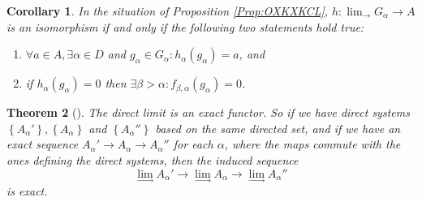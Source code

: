 \documentclass[reqno]{amsart}
\newtheorem{theorem}{Theorem}[section]
\newtheorem{corollary}[theorem]{Corollary}
\theoremstyle{definition}
\theoremstyle{remark}
\begin{document}
\begin{corollary}
    In the situation of Proposition
    \ref{Prop:OXKXKCL},
    $h \colon \lim_{\rightarrow} G_{\alpha} \to A$ is an
    isomorphism if and only if the following two statements
    hold true:
    \begin{enumerate}
        \item $\forall a \in A, \exists \alpha \in D$ and
            $g_{\alpha} \in G_{\alpha} \colon
            h_{\alpha}(g_{\alpha}) = a$, and
        \item if $h_{\alpha}(g_{\alpha}) = 0$ then
            $\exists \beta > \alpha \colon f_{\beta,\alpha}
            (g_{\alpha}) = 0$.
    \end{enumerate}
\end{corollary}

\begin{theorem}[]
    The direct limit is an exact functor.
    So if we have direct systems
    $\left\{ A_{\alpha}' \right\} ,
    \left\{ A_{\alpha} \right\} $ and
    $\left\{ A_{\alpha}'' \right\} $ based on the same
    directed set, and if we have
    an exact sequence
    $A_{\alpha}' \to A_{\alpha} \to A_{\alpha}''$ for each
    $\alpha$, where the maps commute with the ones
    defining the direct systems, then the induced sequence
    \[
    \lim_{\rightarrow} A_{\alpha}' \to 
    \lim_{\rightarrow} A_{\alpha} \to 
    \lim_{\rightarrow} A_{\alpha}''
    \] 
    is exact.
\end{theorem}
\end{document}
